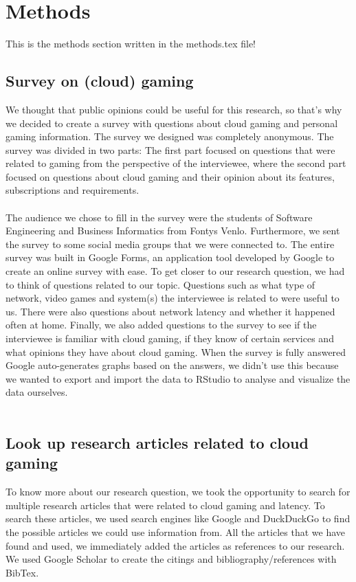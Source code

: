 \section{Methods}
This is the methods section written in the methods.tex file!

\subsection{Survey on (cloud) gaming}
We thought that public opinions could be useful for this research, so that's why we decided to create a survey with questions about cloud gaming and personal gaming information. The survey we designed was completely anonymous. The survey was divided in two parts: The first part focused on questions that were related to gaming from the perspective of the interviewee, where the second part focused on questions about cloud gaming and their opinion about its features, subscriptions and requirements.
\\\\
The audience we chose to fill in the survey were the students of Software Engineering and Business Informatics from Fontys Venlo. Furthermore, we sent the survey to some social media groups that we were connected to. The entire survey was built in Google Forms, an application tool developed by Google to create an online survey with ease. To get closer to our research question, we had to think of questions related to our topic. 
Questions such as what type of network, video games and system(s) the interviewee is related to were useful to us. There were also questions about network latency and whether it happened often at home. Finally, we also added questions to the survey to see if the interviewee is familiar with cloud gaming, if they know of certain services and what opinions they have about cloud gaming. When the survey is fully answered Google auto-generates graphs based on the answers, we didn't use this because we wanted to export and import the data to RStudio to analyse and visualize the data ourselves.
\\\\
\subsection{Look up research articles related to cloud gaming}
To know more about our research question, we took the opportunity to search for multiple research articles that were related to cloud gaming and latency. To search these articles, we used search engines like Google and DuckDuckGo to find the possible articles we could use information from. All the articles that we have found and used, we immediately added the articles as references to our research. We used Google Scholar to create the citings and bibliography/references with BibTex.
\\\\
